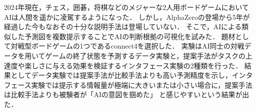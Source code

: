 \abstract
2024年現在，チェス，囲碁，将棋などのメジャーな2人用ボードゲームにおいてAIは人間を遥かに凌駕するようになった\cite{Nikkei}\cite{deepBlue}\cite{dennou}．
しかし，AlphaZero\cite{AlphaZero}の登場から5年が経過した今もなおその十分な説明手法は登場していない．
そこで，AIによる類似した予測図を複数提示することでAIの判断根拠の可視化を試みた．
題材として対戦型ボードゲームの1つであるconnect4\cite{connect4}を選択した．
実験はAI同士の対戦データを用いてゲームの終了状態を予測するデータ実験と，提案手法がタスクの上達度や楽しさに与える効果を検証するインタフェース実験の2種類を行った．
結果としてデータ実験では提案手法が比較手法よりも高い予測精度を示し，インタフェース実験では提示する情報量が極端に大きいまたは小さい場合に，提案手法は比較手法よりも被験者が「AIの意図を掴めた」
と感じやすいという結果が出た．